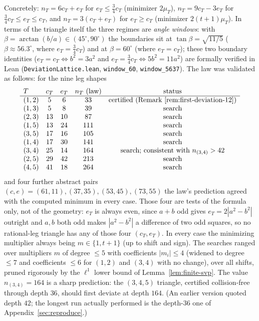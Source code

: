\documentclass[11pt]{article}
\theoremstyle{plain}
\theoremstyle{definition}
\theoremstyle{remark}
\begin{document}
Concretely: $n_T = 6c_T + e_T$ for $e_T \le \tfrac34 c_T$ (minimizer $2\mu_T$),
$n_T = 9c_T - 3e_T$ for $\tfrac34 c_T \le e_T \le c_T$, and
$n_T = 3(c_T+e_T)$ for $e_T \ge c_T$ (minimizer $2(t{+}1)\mu_T$). In terms of
the triangle itself the three regimes are \emph{angle windows}: with
$\beta = \arctan(b/a) \in (45^\circ, 90^\circ)$ the boundaries sit at
$\tan\beta = \sqrt{11/5}$ ($\beta \approx 56.3^\circ$, where
$e_T = \tfrac34 c_T$) and at $\beta = 60^\circ$ (where $e_T = c_T$); these two
boundary identities ($e_T=c_T\Leftrightarrow b^2=3a^2$ and
$e_T=\tfrac34c_T\Leftrightarrow5b^2=11a^2$) are formally verified in Lean
(\texttt{DeviationLattice.lean}, \texttt{window\_60}, \texttt{window\_5637}). The
law was validated as follows: for the nine leg shapes
\[
\begin{array}{lcccc}
T & c_T & e_T & n_T\ \text{(law)} & \text{status}\\\hline
(1,2) & 5 & 6 & 33 & \text{certified (Remark~\ref{rem:first-deviation-12})}\\
(1,3) & 5 & 8 & 39 & \text{search}\\
(2,3) & 13 & 10 & 87 & \text{search}\\
(1,5) & 13 & 24 & 111 & \text{search}\\
(3,5) & 17 & 16 & 105 & \text{search}\\
(1,4) & 17 & 30 & 141 & \text{search}\\
(3,4) & 25 & 14 & 164 & \text{search; consistent with }n_{(3,4)} > 42\\
(2,5) & 29 & 42 & 213 & \text{search}\\
(4,5) & 41 & 18 & 264 & \text{search}
\end{array}
\]
and four further abstract pairs $(c,e) = (61,11), (37,35), (53,45), (73,55)$
the law's prediction agreed with the computed minimum in every case. Those four
are tests of the formula only, not of the geometry: $e_T$ is always even, since
$a+b$ odd gives $e_T = 2|a^2-b^2|$ outright and $a,b$ both odd makes
$|a^2-b^2|$ a difference of two odd squares, so no rational-leg triangle has
any of those four $(c_T,e_T)$. In every case the
minimizing multiplier always being $m \in \{1, t+1\}$ (up to shift and sign).
The searches ranged over multipliers $m$ of degree $\le 5$ with coefficients
$|m_i| \le 4$ (widened to degree $\le 7$ and coefficients $\le 6$ for $(1,2)$
and $(3,4)$ with no change), over all shifts, pruned rigorously by the
$\ell^1$ lower bound of Lemma~\ref{lem:finite-svp}. The value $n_{(3,4)} = 164$ is a sharp prediction: the $(3,4,5)$ triangle,
certified collision-free through depth $36$, should first deviate at depth $164$.
(An earlier version quoted depth $42$; the longest run actually performed is the
depth-$36$ one of Appendix~\ref{sec:reproduce}.)
\end{document}
